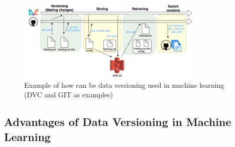 \begin{figure}[H]
    \centering
    \includegraphics[width=0.8\textwidth]{fig/ml-dv-example.png}
    \caption{Example of how can be data versioning used in 
    machine learning (DVC and GIT as examples) \cite{opendatascience}}
    \label{fig:ml-dv-example}
\end{figure}

\subsection{Advantages of Data Versioning in Machine Learning}

